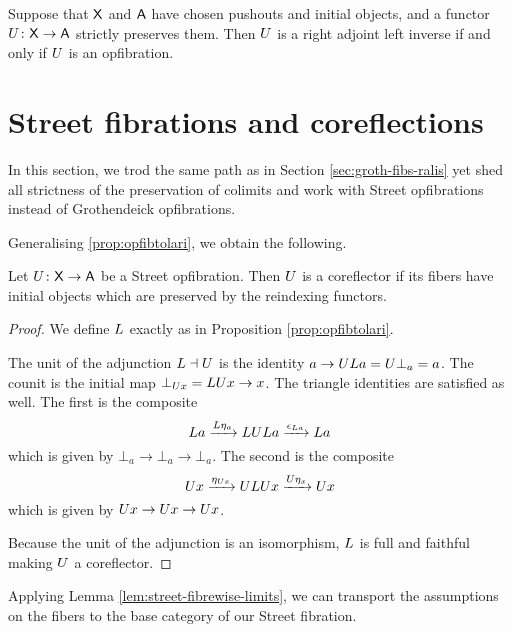 \documentclass{amsart}
\begin{document}
\begin{thm}\label{thm:mainthm}
Suppose that $\mathsf{X}$ and $\mathsf{A}$ have chosen pushouts and initial objects, and a functor $U\colon\mathsf{X}\to\mathsf{A}$ strictly preserves them. Then $U$ is a right adjoint left inverse if and only if $U$ is an opfibration.
\end{thm}


\section{Street fibrations and coreflections}\label{Streetfibs}

In this section, we trod the same path as in Section
\ref{sec:groth-fibs-ralis} yet shed all strictness of the
preservation of colimits and work with Street opfibrations
instead of Grothendeick opfibrations.

Generalising \cref{prop:opfibtolari}, we obtain
the following. 

\begin{prop}
  \label{thm:street-opfib-to-corefl}
  Let $ U \colon \mathsf{X} \to \mathsf{A} $ be a Street
  opfibration. Then $ U $ is a coreflector if its
  fibers have initial objects which are preserved
  by the reindexing functors.
\end{prop}

\begin{proof}
  We define $ L $ exactly as in Proposition
  \ref{prop:opfibtolari}. 

  The unit of the adjunction $ L \dashv U $ is the
  identity $ a\to UL a = U\bot_a = a $.  The
  counit is the initial map $ \bot_{U x} = LU x \to
  x $.  The triangle identities are satisfied as
  well. The first is the composite
  \[
    L a
    \xrightarrow{L\eta_a}        LUL a
    \xrightarrow{\epsilon_{L a}} L a
  \]
  which is given by $ \bot_a \to \bot_a \to \bot_a
  $.  The second is the composite
  \[
    U x
    \xrightarrow{\eta_{U x}} ULU x
    \xrightarrow{U\eta_x}    U x
  \]
  which is given by $ U x \to U x \to U x $.

  Because the unit of the adjunction is an
  isomorphism, $ L $ is full and faithful
  \cite[{Prop.~1.3}]{gabrielzisman} making $ U $ a
  coreflector.
\end{proof}

Applying Lemma \ref{lem:street-fibrewise-limits}, we can
transport the assumptions on the fibers to the base category
of our Street fibration.
\end{document}
